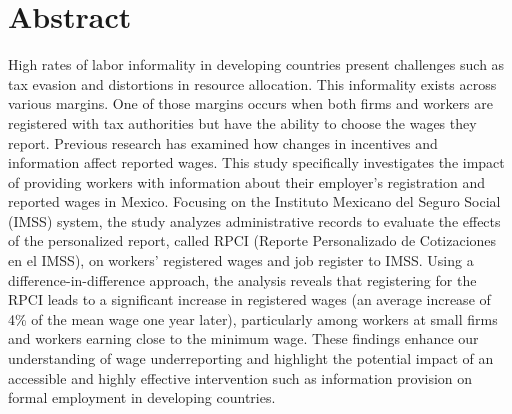 \documentclass[10pt, oneside]{book}
\begin{document}
\pagestyle{plain}

\noindent 


\chapter*{Abstract}

\noindent High rates of labor informality in developing countries present challenges such as tax evasion and distortions in resource allocation. This informality exists across various margins. One of those margins occurs when both firms and workers are registered with tax authorities but have the ability to choose the wages they report. Previous research has examined how changes in incentives and information affect reported wages. This study specifically investigates the impact of providing workers with information about their employer's registration and reported wages in Mexico. Focusing on the Instituto Mexicano del Seguro Social (IMSS) system, the study analyzes administrative records to evaluate the effects of the personalized report, called RPCI (Reporte Personalizado de Cotizaciones en el IMSS), on workers' registered wages and job register to IMSS. Using a difference-in-difference approach, the analysis reveals that registering for the RPCI leads to a significant increase in registered wages (an average increase of 4\% of the mean wage one year later), particularly among workers at small firms and workers earning close to the minimum wage. These findings enhance our understanding of wage underreporting and highlight the potential impact of an accessible and highly effective intervention such as information provision on formal employment in developing countries.

\pagestyle{plain}
\newpage
\noindent 


\tableofcontents

\end{document}
